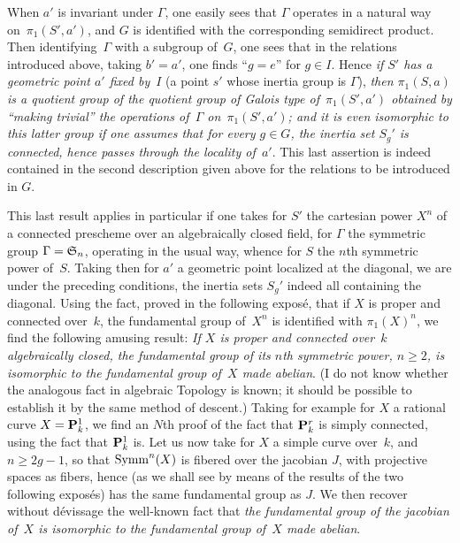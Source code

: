 \begin{remark}
When $a'$ is invariant under $\Gamma$, one easily sees that $\Gamma$
operates in a natural way on~$\pi_1(S',a')$, and $G$ is identified
with the corresponding semidirect product. Then identifying~$\Gamma$
with a subgroup of~$G$, one sees that in the relations
introduced above, taking $b'=a'$, one finds ``$g = e$'' for $g\in I$.
Hence \emph{if $S'$ has a geometric point $a'$ fixed by}~$I$ (\ie a
point $s'$ whose inertia group is $\Gamma$), \emph{then $\pi_1(S,a)$
is a quotient group of the quotient group of Galois type
of~$\pi_1(S',a')$ obtained by \emph{``making trivial''} the operations
of~$\Gamma$ on~$\pi_1(S',a')$; and it is even isomorphic to this
latter group if one assumes that for every $g\in G$, the inertia set
$S_g'$ is connected, hence passes through the locality of~$a'$}. This
last assertion is indeed contained in the second description given
above for the relations to be introduced in $G$.

This last result applies in particular if one takes for $S'$ the
cartesian power $X^n$ of a connected prescheme over an algebraically
closed field, for $\Gamma$ the symmetric group $\Gamma={\mathfrak {S}}_n$,
operating in the usual way, whence for $S$ the $n$th symmetric power
of~$S$. Taking then for $a'$ a geometric point localized at the
diagonal, we are under the preceding conditions, the inertia sets
$S_g'$ indeed all containing the diagonal. Using the fact, proved in
the following exposé, that if $X$ is proper and connected over~$k$,
the fundamental group of~$X^n$ is identified with $\pi_1(X)^n$, we
find the following amusing result: \emph{If $X$ is proper and
connected over~$k$ algebraically closed, the fundamental group of its
$n$th symmetric power, $n \geq 2$, is isomorphic to the fundamental
group of~$X$ made abelian}. (I do not know whether the analogous fact
in algebraic Topology is known; it should be possible to establish it
by the same method of descent.) Taking for example for $X$ a rational
curve $X=\mathbf{P}^1_k$, we find an $N$th proof of the fact that $\mathbf{P}^r_k$
is simply connected, using the fact that $\mathbf{P}^1_k$ is. Let us now
take for $X$ a simple curve over~$k$, and $n\geq 2g-1$, so that
$\operatorname{Symm}^n(X)$ is fibered over the jacobian $J$, with projective spaces as
fibers, hence (as we shall see by means of the results of the two
following exposés) has the same fundamental group as $J$. We then
recover without dévissage the well-known fact that \emph{the
fundamental group of the jacobian of~$X$ is isomorphic to the
fundamental group of~$X$ made abelian}.
\end{remark}
